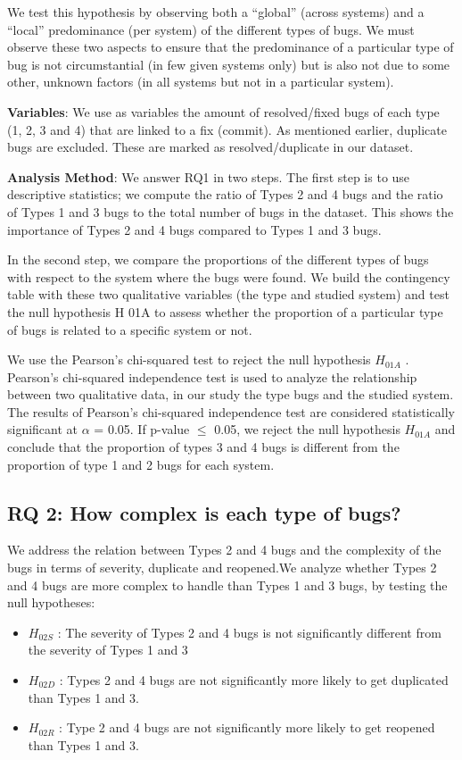 We test this hypothesis by observing both a “global”
(across systems) and a “local” predominance (per system) of
the different types of bugs. We must observe these two
aspects to ensure that the predominance of a particular type of
bug is not circumstantial (in few given systems only) but is
also not due to some other, unknown factors (in all systems
but not in a particular system).

{\bf Variables}: We use as variables the amount of resolved/fixed
bugs of each type (1, 2, 3 and 4) that are linked to a fix
(commit). As mentioned earlier, duplicate bugs are excluded.
These are marked as resolved/duplicate in our dataset.

{\bf Analysis Method}: We answer RQ1 in two steps. The first
step is to use descriptive statistics; we compute the ratio of
Types 2 and 4 bugs and the ratio of Types 1 and 3 bugs to the
total number of bugs in the dataset. This shows the
importance of Types 2 and 4 bugs compared to Types 1 and 3
bugs.

In the second step, we compare the proportions of the
different types of bugs with respect to the system where the
bugs were found. We build the contingency table with these
two qualitative variables (the type and studied system) and
test the null hypothesis H 01A to assess whether the proportion
of a particular type of bugs is related to a specific system or
not.

We use the Pearson's chi-squared test to reject the null
hypothesis $H_{01A}$ . Pearson’s chi-squared independence test is
used to analyze the relationship between two qualitative data,
in our study the type bugs and the studied system. The results
of Pearson’s chi-squared independence test are considered
statistically significant at $\alpha$ = 0.05. If p-value $\le$ 0.05, we
reject the null hypothesis $H_{01A}$ and conclude that the
proportion of types 3 and 4 bugs is different from the
proportion of type 1 and 2 bugs for each system.

\subsection{RQ 2: How complex is each type of bugs?}

We address the relation between Types 2 and 4 bugs and
the complexity of the bugs in terms of severity, duplicate and
reopened.We analyze whether Types 2 and 4 bugs are more
complex to handle than Types 1 and 3 bugs, by testing the
null hypotheses:

\begin{itemize}
 \item  $H_{02S}$ : The severity of Types 2 and 4 bugs is not
significantly different from the severity of Types 1 and 3
 \item  $H_{02D}$ : Types 2 and 4 bugs are not significantly more
likely to get duplicated than Types 1 and 3.
 \item  $H_{02R}$ : Type 2 and 4 bugs are not significantly more
likely to get reopened than Types 1 and 3.
\end{itemize}

